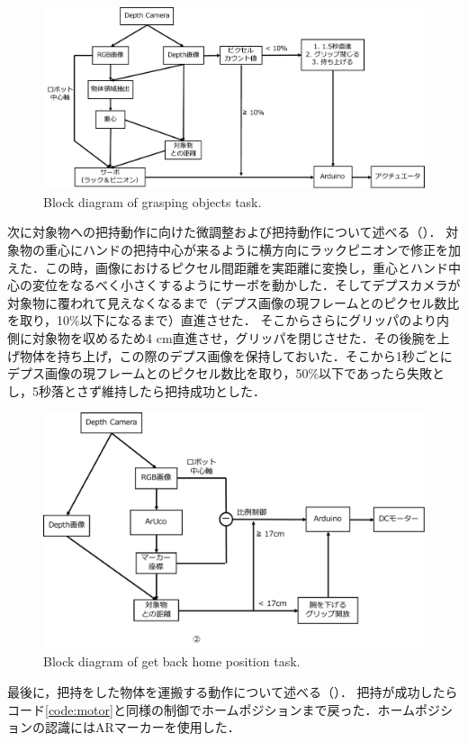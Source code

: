 \begin{figure}
    \centering
    \includegraphics[width=0.7\linewidth]{figure/chapter4/2号機制御図_把持}
    \caption{Block diagram of grasping objects task.}
    \label{fig:2号機把持}
\end{figure}

次に対象物への把持動作に向けた微調整および把持動作について述べる（）．
対象物の重心にハンドの把持中心が来るように横方向にラックピニオンで修正を加えた．この時，画像におけるピクセル間距離を実距離に変換し，重心とハンド中心の変位をなるべく小さくするようにサーボを動かした．そしてデプスカメラが対象物に覆われて見えなくなるまで（デプス画像の現フレームとのピクセル数比を取り，10\%以下になるまで）直進させた．
そこからさらにグリッパのより内側に対象物を収めるため4 cm直進させ，グリッパを閉じさせた．その後腕を上げ物体を持ち上げ，この際のデプス画像を保持しておいた．そこから1秒ごとにデプス画像の現フレームとのピクセル数比を取り，50\%以下であったら失敗とし，5秒落とさず維持したら把持成功とした．

\begin{figure}
    \centering
    \includegraphics[width=0.7\linewidth]{figure/chapter4/2号機制御図_AR}
    \caption{Block diagram of get back home position task.}
    \label{fig:2号機AR}
\end{figure}

最後に，把持をした物体を運搬する動作について述べる（）．
把持が成功したらコード\ref{code:motor}と同様の制御でホームポジションまで戻った．ホームポジションの認識にはARマーカーを使用した．

